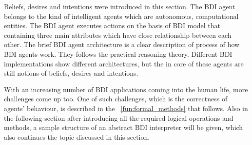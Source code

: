  Beliefs, desires and intentions were introduced in this section. The BDI agent belongs to the kind of intelligent agents which are autonomous, computational entities. The BDI agent executes actions on the basis of BDI model that containing three main attributes which have close relationship between each other. The brief BDI agent architecture is a clear description of process of how BDI agents work. They follows the practical reasoning theory. Different BDI implementations show different architectures, but the in core of these agents are still notions of beliefs, desires and intentions. 
 
 With an increasing number of BDI applications coming into the human life, more challenges come up too. One of such challenges, which is the correctness of agents' behaviour, is described in the ~\autoref{fun:formal_methods} that follows. Also in the following section after introducing all the required logical operations and methods, a sample structure of an abstract BDI interpreter will be given, which also continues the topic discussed in this section.



